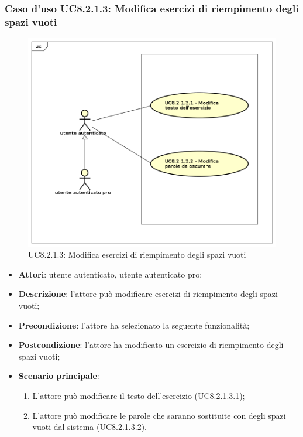 \subsubsection{Caso d'uso UC8.2.1.3: Modifica esercizi di riempimento degli spazi vuoti}
	\label{UC8.2.1.3}
	\begin{figure}[h]
		\centering
			\includegraphics[scale=0.45,keepaspectratio]{UML/UC8_2_1_3.png}
		\caption{UC8.2.1.3: Modifica esercizi di riempimento degli spazi vuoti}
	\end{figure}
	\FloatBarrier
	\begin{itemize}
		\item
			\textbf{Attori}: utente autenticato, utente autenticato pro;
		\item		
			\textbf{Descrizione}: l'attore può modificare esercizi di riempimento degli spazi vuoti;
		\item
			\textbf{Precondizione}: l'attore ha selezionato la seguente funzionalità; 
		\item
			\textbf{Postcondizione}: l'attore ha modificato un esercizio di riempimento degli spazi vuoti;
		\item
			\textbf{Scenario principale}:
	       		\begin{enumerate}
	       			\item
	       			L'attore può modificare il testo dell'esercizio (UC8.2.1.3.1);
	       			\item
	       			L'attore può modificare le parole che saranno sostituite con degli spazi vuoti dal sistema (UC8.2.1.3.2).
	 			\end{enumerate}
	\end{itemize}
	
